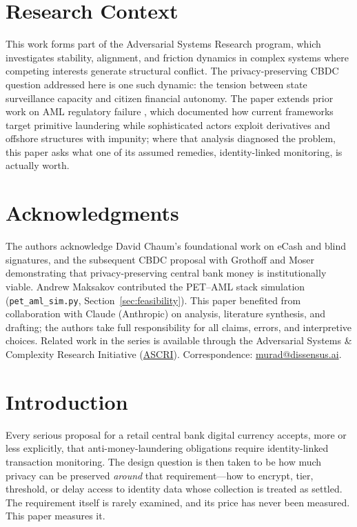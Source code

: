 \documentclass[11pt]{article}
\begin{document}
\vspace{1em}

\section*{Research Context}

This work forms part of the Adversarial Systems Research program, which investigates stability,
alignment, and friction dynamics in complex systems where competing interests generate structural
conflict. The privacy-preserving CBDC question addressed here is one such dynamic: the tension between
state surveillance capacity and citizen financial autonomy. The paper extends prior work on AML
regulatory failure \citep{farzulla2025hedging}, which documented how current frameworks target
primitive laundering while sophisticated actors exploit derivatives and offshore structures with
impunity; where that analysis diagnosed the problem, this paper asks what one of its assumed remedies,
identity-linked monitoring, is actually worth.

\section*{Acknowledgments}

The authors acknowledge David Chaum's foundational work on eCash and blind signatures, and the
subsequent CBDC proposal with Grothoff and Moser \citep{ChaumGrothoffMoser2021} demonstrating that
privacy-preserving central bank money is institutionally viable. Andrew Maksakov contributed the
PET--AML stack simulation (\texttt{pet\_aml\_sim.py}, Section~\ref{sec:feasibility}). This paper
benefited from collaboration with Claude (Anthropic) on analysis, literature synthesis, and drafting;
the authors take full responsibility for all claims, errors, and interpretive choices. Related work in
the series is available through the Adversarial Systems \& Complexity Research Initiative
(\href{https://systems.ac}{ASCRI}). Correspondence:
\href{mailto:murad@dissensus.ai}{murad@dissensus.ai}.

\clearpage
\tableofcontents
\thispagestyle{firstpage}
\clearpage
\section{Introduction}
\label{sec:introduction}

Every serious proposal for a retail central bank digital currency accepts, more or less explicitly,
that anti-money-laundering obligations require identity-linked transaction monitoring. The design
question is then taken to be how much privacy can be preserved \emph{around} that requirement---how
to encrypt, tier, threshold, or delay access to identity data whose collection is treated as
settled. The requirement itself is rarely examined, and its price has never been measured. This
paper measures it.
\end{document}

